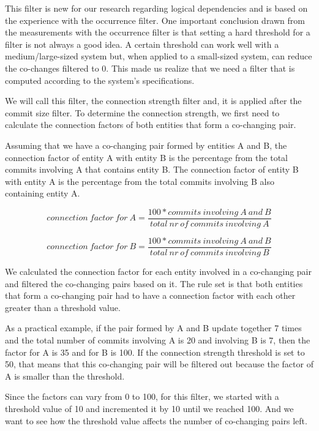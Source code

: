 \documentclass[runningheads]{comsis2}
\begin{document}
This filter is new for our research regarding logical dependencies and is based on the experience with the occurrence filter.  One important conclusion drawn from the measurements with the occurrence filter is that setting a hard threshold for a filter is not always a good idea. A certain threshold can work well with a medium/large-sized system but, when applied to a small-sized system, can reduce the co-changes filtered to 0. This made us realize that we need a filter that is computed according to the system's specifications. 

We will call this filter, the connection strength filter and, it is applied after the commit size filter. To determine the connection strength, we first need to calculate the connection factors of both entities that form a co-changing pair.

Assuming that we have a co-changing pair formed by entities A and B, the connection factor of entity A with entity B is the percentage from the total commits involving A that contains entity B. The connection factor of entity B with entity A is the percentage from the total commits involving B also containing entity A.

\begin{equation}
 connection\ factor\ for\ A = \frac{100 * commits\ involving\ A\ and\ B}{total\ nr\ of\ commits\ involving\ A}
\end{equation}

\begin{equation}
 connection\ factor\ for\ B = \frac{100 * commits\ involving\ A\ and\ B}{total\ nr\ of\ commits\ involving\ B}
\end{equation}



We calculated the connection factor for each entity involved in a co-changing pair and filtered the co-changing pairs based on it. The rule set is that both entities that form a co-changing pair had to have a connection factor with each other greater than a threshold value.

As a practical example, if the pair formed by A and B update together 7 times and the total number of commits involving A is 20 and involving B is 7, then the factor for A is 35 and for B is 100. If the connection strength threshold is set to 50, that means that this co-changing pair will be filtered out because the factor of A is smaller than the threshold. 

Since the factors can vary from 0 to 100, for this filter, we started with a threshold value of 10 and incremented it by 10 until we reached 100. And we want to see how the threshold value affects the number of co-changing pairs left. 
\end{document}

